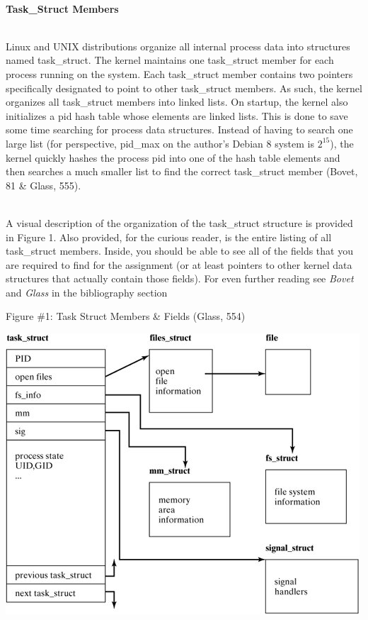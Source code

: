 \documentclass[12pt]{extarticle}
\newenvironment{myindentpar}[1]%
 {\begin{list}{}%
         {\setlength{\leftmargin}{#1}}%
         \item[]%
 }
 {\end{list}}
\begin{document}
\begin{myindentpar}{5mm}

    \ \\
    \textbf{Task\_Struct Members}
    
    \ \\
    Linux and UNIX distributions organize all internal process data into structures named task\_struct.  The kernel maintains one task\_struct member for each process running on the system.  Each task\_struct member contains two pointers specifically designated to point to other task\_struct members.  As such, the kernel organizes all task\_struct members into linked lists.  On startup, the kernel also initializes a pid hash table whose elements are linked lists.  This is done to save some time searching for process data structures.  Instead of having to search one large list (for perspective, pid\_max on the author's Debian 8 system is $2^{15}$), the kernel quickly hashes the process pid into one of the hash table elements and then searches a much smaller list to find the correct task\_struct member (Bovet, 81 \& Glass, 555).    
    
    \ \\
    A visual description of the organization of the task\_struct structure is provided in Figure 1.  Also provided, for the curious reader, is the entire listing of all task\_struct members.  Inside, you should be able to see all of the fields that you are required to find for the assignment (or at least pointers to other kernel data structures that actually contain those fields).  For even further reading see \textit{Bovet} and \textit{Glass} in the bibliography section

    \begin{center}
        Figure \#1: Task Struct Members \& Fields (Glass, 554)
    \end{center}
    \begin{center}
        \includegraphics{task_struct.png}
    \end{center}
    

\end{myindentpar}
\end{document}
